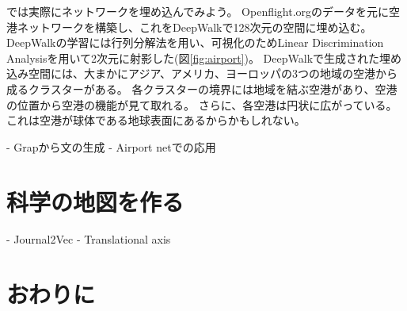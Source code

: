 \documentclass[J]{scitrans}
\begin{document}
では実際にネットワークを埋め込んでみよう。
Openflight.orgのデータを元に空港ネットワークを構築し、これをDeepWalkで128次元の空間に埋め込む。
DeepWalkの学習には行列分解法\cite{Qiu2018}を用い、可視化のためLinear Discrimination Analysisを用いて2次元に射影した(図\ref{fig:airport})。
DeepWalkで生成された埋め込み空間には、大まかにアジア、アメリカ、ヨーロッパの3つの地域の空港から成るクラスターがある。
各クラスターの境界には地域を結ぶ空港があり、空港の位置から空港の機能が見て取れる。
さらに、各空港は円状に広がっている。これは空港が球体である地球表面にあるからかもしれない。
%


    - Grapから文の生成
- Airport netでの応用

\section{科学の地図を作る}

- Journal2Vec
- Translational axis




\section{おわりに}


\acknowledgement





\end{document}
